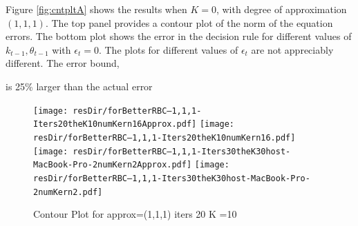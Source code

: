 \documentclass[12pt]{article}
\begin{document}



Figure \ref{fig:cntpltA} shows the results when $K=0$, with degree of approximation $(1,1,1)$.  The top panel provides a contour plot of the
norm of the equation errors. The bottom plot shows the error in the decision rule for different values of $k_{t-1}, \theta_{t-1}$ with $\epsilon_t=0$.  The plots for different values of $\epsilon_t$ are not appreciably different. The error bound, 
\ifmacosx
 
\fi
\iflinux
 
\fi
is 25\% larger than the actual error 
\ifmacosx

\fi
\iflinux

\fi



\begin{figure}
  \centering
\iflinux
  \texttt{[image: resDir/forBetterRBC--1,1,1-Iters20theK10numKern16Approx.pdf]}
  \texttt{[image: resDir/forBetterRBC--1,1,1-Iters20theK10numKern16.pdf]}
\fi
\ifmacosx
  \texttt{[image: resDir/forBetterRBC--1,1,1-Iters30theK30host-MacBook-Pro-2numKern2Approx.pdf]}
  \texttt{[image: resDir/forBetterRBC--1,1,1-Iters30theK30host-MacBook-Pro-2numKern2.pdf]}
\fi
  \caption{Contour Plot for approx=(1,1,1) iters 20 K =10}
  \label{fig:cntpltC}
\end{figure}



\end{document}
